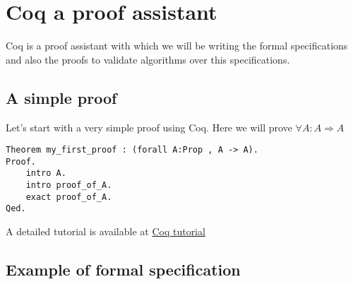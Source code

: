 \chapter{Coq a proof assistant}

    Coq is a proof assistant with which we will be writing the formal specifications and also the proofs
to validate algorithms over this specifications.

\section{A simple proof}

    Let's start with a very simple proof using Coq. Here we will prove $ \forall A : A \Rightarrow A $

\begin{verbatim}
Theorem my_first_proof : (forall A:Prop , A -> A).
Proof.
    intro A.
    intro proof_of_A.
    exact proof_of_A.
Qed. 
\end{verbatim}

A detailed tutorial is available at \href{https://coq.inria.fr/tutorial-nahas}{Coq tutorial}

\section{Example of formal specification}

